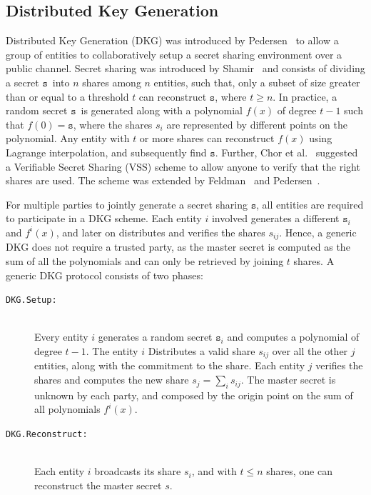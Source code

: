 \documentclass[journal]{IEEEtran}
\newcommand{\K}{\ensuremath{\mathtt{s}}}
\begin{document}
\subsection{Distributed Key Generation}
Distributed Key Generation (DKG) was introduced by Pedersen~\cite{Pedersen:1991:NIS:646756.705507} to allow a group of entities to collaboratively setup a secret sharing environment over a public channel.
Secret sharing was introduced by Shamir~\cite{Shamir1979} and consists of dividing a secret \K\ into $n$ shares among $n$ entities, such that, only a subset of size greater than or equal to a threshold $t$ can reconstruct \K, where $t \geq n$. In practice, a random secret \K\ is generated along with a polynomial $f(x)$ of degree $t-1$ such that $f(0)=\K$, where the shares $s_i$ are represented by different points on the polynomial. Any entity with $t$ or more shares can reconstruct $f(x)$ using Lagrange interpolation, and subsequently find $\K$. Further, Chor et al.~\cite{DBLP:conf/focs/ChorGMA85} suggested a Verifiable Secret Sharing (VSS) scheme to allow anyone to verify that the right shares are used. The scheme was extended by Feldman~\cite{Feldman:1987:PSN:1382440.1383000} and Pedersen~\cite{Pedersen:1991:NIS:646756.705507}. 

For multiple parties to jointly generate a secret sharing \K, all entities are required to participate in a DKG scheme. Each entity $i$ involved generates a different $\K_i$ and $f^i(x)$, and later on distributes and verifies the shares $s_{ij}$. Hence, a generic DKG does not require a trusted party, as the master secret is computed as the sum of all the polynomials and can only be retrieved by joining $t$ shares. A generic DKG protocol consists of two phases:

\begin{description}
    \item[\texttt{DKG.Setup:}]~\\ Every entity $i$ generates a random secret $\K_i$ and computes a polynomial of degree $t-1$. The entity $i$ Distributes a valid share $s_{ij}$ over all the other $j$ entities, along with the commitment to the share. Each entity $j$ verifies the shares and computes the new share $s_j = \sum_i s_{ij}$. The master secret is unknown by each party, and composed by the origin point on the sum of all polynomials $f^i(x)$.
    \item[\texttt{DKG.Reconstruct:}]~\\ Each entity $i$ broadcasts its share $s_i$, and with $t \leq n$ shares, one can reconstruct the master secret $s$.
\end{description}
\end{document}
